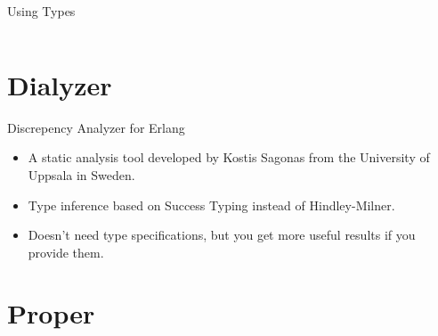 \documentclass{beamer}
\begin{document}
\begin{frame}{Using Types}

  \inputminted[firstline=12, lastline=13]{erlang}{src/cards.erl}

\end{frame}


\section{Dialyzer}


\begin{frame}{Discrepency Analyzer for Erlang}

  \begin{itemize}[<+->]
  \item A static analysis tool developed by Kostis Sagonas from the
    University of Uppsala in Sweden.
  \item Type inference based on Success Typing instead of
    Hindley-Milner.
  \item Doesn't need type specifications, but you get more useful
    results if you provide them.
  \end{itemize}

\end{frame}


\section{Proper}
\end{document}
